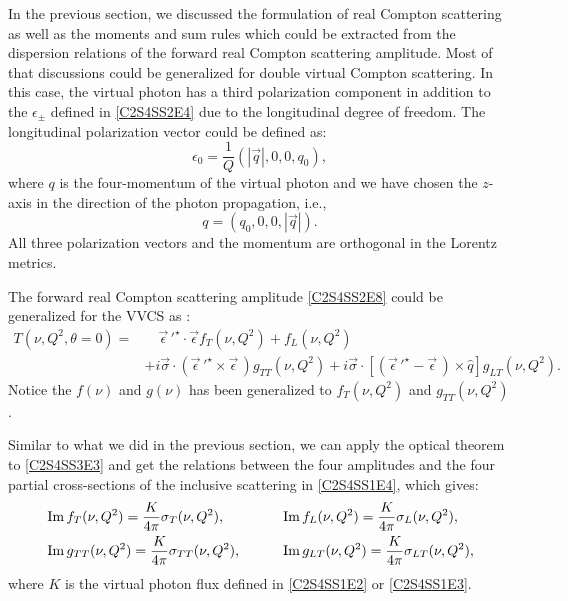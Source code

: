 In the previous section, we discussed the formulation of real Compton scattering as well as the moments and sum rules which could be extracted from the dispersion relations of the forward real Compton scattering amplitude. Most of that discussions could be generalized for double virtual Compton scattering. In this case, the virtual photon has a third polarization component in addition to the $\epsilon_\pm$ defined in \cref{C2S4SS2E4} due to the longitudinal degree of freedom. The longitudinal polarization vector could be defined as:
\begin{equation} \label{C2S4SS3E1}
\epsilon_0 = \frac{1}{Q}(|\vec{q}|,0,0,q_0),
\end{equation}
where $q$ is the four-momentum of the virtual photon and we have chosen the $z$-axis in the direction of the photon propagation, i.e.,
\begin{equation} \label{C2S4SS3E2}
q = (q_0,0,0,|\vec{q}|).
\end{equation}
All three polarization vectors and the momentum are orthogonal in the Lorentz metrics.

The forward real Compton scattering amplitude \cref{C2S4SS2E8} could be generalized for the VVCS as \cite{Drechsel2003}:
\begin{equation} \label{C2S4SS3E3}
\begin{split}
T(\nu,Q^2,\theta=0) = & \quad \vec{\epsilon}\,'^\star\cdot\vec{\epsilon}f_T(\nu,Q^2)+f_L(\nu,Q^2) \\
& +i\vec{\sigma}\cdot(\vec{\epsilon}\,'^\star\times\vec{\epsilon}\,)g_{TT}(\nu,Q^2)+i\vec{\sigma}\cdot[(\vec{\epsilon}\,'^\star-\vec{\epsilon}\,)\times\hat{q}]g_{LT}(\nu,Q^2).
\end{split}
\end{equation}
Notice the $f(\nu)$ and $g(\nu)$ has been generalized to $f_T(\nu,Q^2)$ and $g_{TT}(\nu,Q^2)$.

Similar to what we did in the previous section, we can apply the optical theorem to \cref{C2S4SS3E3} and get the relations between the four amplitudes and the four partial cross-sections of the inclusive scattering in \cref{C2S4SS1E4}, which gives:
\begin{equation} \label{C2S4SS3E4}
\begin{aligned}
& \Im f_T(\nu,Q^2) = \frac{K}{4\pi}\sigma_T(\nu,Q^2), & \qquad & \Im f_L(\nu,Q^2) = \frac{K}{4\pi}\sigma_L(\nu,Q^2), \\
& \Im g_{TT}(\nu,Q^2) = \frac{K}{4\pi}\sigma_{TT}(\nu,Q^2), & \qquad & \Im g_{LT}(\nu,Q^2) = \frac{K}{4\pi}\sigma_{LT}(\nu,Q^2),
\end{aligned}
\end{equation}
where $K$ is the virtual photon flux defined in \cref{C2S4SS1E2} or \cref{C2S4SS1E3}.

